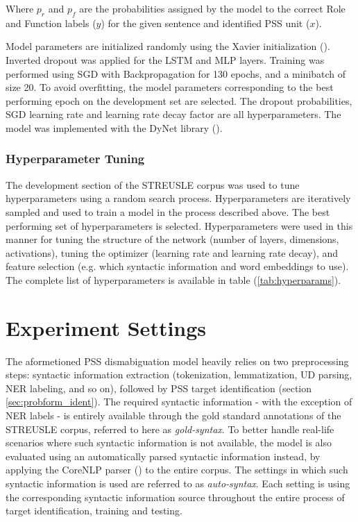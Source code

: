Where $p_r$ and $p_f$ are the probabilities assigned by the model to the correct Role and Function labels ($y$) for the given sentence and identified PSS unit ($x$).

Model parameters are initialized randomly using the Xavier initialization (\cite{glorot10xavier}). Inverted dropout was applied for the LSTM and MLP layers. Training was performed using SGD with Backpropagation for 130 epochs, and a minibatch of size 20. To avoid overfitting, the model parameters corresponding to the best performing epoch on the development set are selected. The dropout probabilities, SGD learning rate and learning rate decay factor are all hyperparameters. The model was implemented with the DyNet library (\cite{dynet}).

\subsubsection{Hyperparameter Tuning}

The development section of the STREUSLE corpus was used to tune hyperparameters using a random search process. Hyperparameters are iteratively sampled and used to train a model in the process described above. The best performing set of hyperparameters is selected. Hyperparameters were used in this manner for tuning the structure of the network (number of layers, dimensions, activations), tuning the optimizer (learning rate and learning rate decay), and feature selection (e.g. which syntactic information and word embeddings to use). The complete list of hyperparameters is available in table (\ref{tab:hyperparams}).

\section{Experiment Settings} \label{sec:psssettings}

The aformetioned PSS dismabiguation model heavily relies on two preprocessing steps: syntactic information extraction (tokenization, lemmatization, UD parsing, NER labeling, and so on), followed by PSS target identification (section \ref{sec:probform_ident}). The required syntactic information - with the exception of NER labels - is entirely available through the gold standard annotations of the STREUSLE corpus, referred to here as \textit{gold-syntax}. To better handle real-life scenarios where such syntactic information is not available, the model is also evaluated using an automatically parsed syntactic information instead, by applying the CoreNLP parser (\cite{manning14stanford}) to the entire corpus. The settings in which such syntactic information is used are referred to as \textit{auto-syntax}. Each setting is using the corresponding syntactic information source throughout the entire process of target identification, training and testing. 

